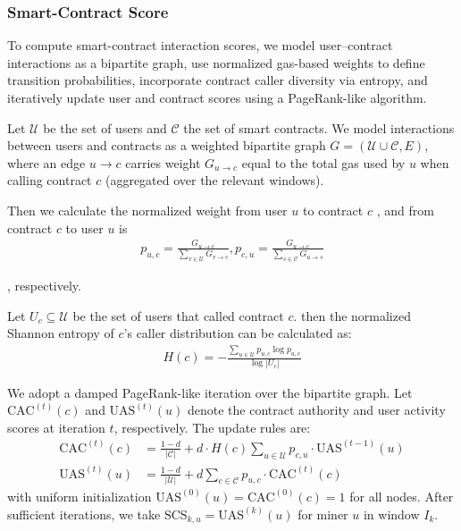 \documentclass[journal]{IEEEtran}
\begin{document}
\subsubsection{Smart-Contract Score}
To compute smart-contract interaction scores, we model user–contract interactions as a bipartite graph, use normalized gas-based weights to define transition probabilities, incorporate contract caller diversity via entropy, and iteratively update user and contract scores using a PageRank-like algorithm.

Let $\mathcal{U}$ be the set of users and $\mathcal{C}$ the set of smart contracts. We model interactions between users and contracts as a weighted bipartite graph $G = (\mathcal{U} \cup \mathcal{C}, E)$, where an edge $u \to c$ carries weight $G_{u\to c}$ equal to the total gas used by $u$ when calling contract $c$ (aggregated over the relevant windows).

Then we calculate the normalized weight from user $u$ to contract $c$ , and from contract $c$ to user $u$ is
\begin{align}
    p_{u,c} = \frac{G_{u\to c}}{\sum_{v\in\mathcal{U}} G_{v\to c}},p_{c,u}=\frac{G_{u\to c}}{\sum_{s\in\mathcal{C}} G_{u\to s}}
\end{align}

, respectively.

Let $U_c \subseteq \mathcal{U}$ be the set of users that called contract $c$. then the normalized Shannon entropy of $c$'s caller distribution can be calculated as:
\begin{align}
    H(c) = -\frac{\sum_{u\in\mathcal{U}} p_{u,c} \log p_{u,c}}{\log |U_c|}
\end{align}

We adopt a damped PageRank\cite{page1999pagerank}-like iteration over the bipartite graph. Let $\text{CAC}^{(t)}(c)$ and $\text{UAS}^{(t)}(u)$ denote the contract authority and user activity scores at iteration $t$, respectively. The update rules are:
\begin{align}
\text{CAC}^{(t)}(c) &= \frac{1-d}{|\mathcal{C}|} 
+ d \cdot H(c) 
  \sum_{u\in\mathcal{U}} p_{c,u} \cdot \text{UAS}^{(t-1)}(u)
\\
\text{UAS}^{(t)}(u) &= \frac{1-d}{|\mathcal{U}|} 
+ d \sum_{c\in\mathcal{C}} p_{u,c} \cdot \text{CAC}^{(t)}(c)
\end{align}
with uniform initialization $\text{UAS}^{(0)}(u) = \text{CAC}^{(0)}(c) = 1$ for all nodes. After sufficient iterations, we take $\text{SCS}_{k,u} = \text{UAS}^{(k)}(u)$ for miner $u$ in window $I_k$.
\end{document}
